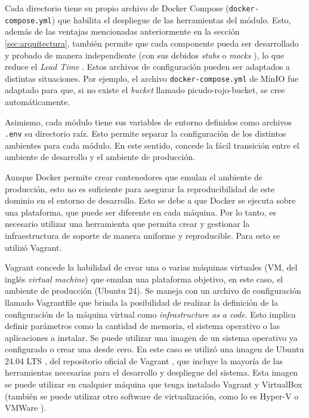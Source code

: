Cada directorio tiene su propio archivo de Docker Compose (\lstinline[language=sh]|docker-compose.yml|) que habilita el despliegue de las herramientas del módulo. Esto, además de las ventajas mencionadas anteriormente en la sección \ref{sec:arquitectura}, también permite que cada componente pueda ser desarrollado y probado de manera independiente (con sus debidos \textit{stubs} \citep{wikipedia_talon_2025} o \textit{mocks} \citep{wikipedia_objeto_2024}), lo que reduce el \textit{Lead Time} \citep{wikipedia_lead_2025}. Estos archivos de configuración pueden ser adaptados a distintas situaciones. Por ejemplo, el archivo \lstinline[language=sh]|docker-compose.yml| de MinIO fue adaptado para que, si no existe el \textit{bucket} llamado picudo-rojo-bucket, se cree automáticamente.

Asimismo, cada módulo tiene sus variables de entorno definidos como archivos \lstinline[language=sh]|.env| su directorio raíz. Esto permite separar la configuración de los distintos ambientes para cada módulo. En este sentido, concede la fácil transición entre el ambiente de desarrollo y el ambiente de producción.

Aunque Docker permite crear contenedores que emulan el ambiente de producción, esto no es suficiente para asegurar la reproducibilidad de este dominio en el entorno de desarrollo. Esto se debe a que Docker se ejecuta sobre una plataforma, que puede ser diferente en cada máquina. Por lo tanto, es necesario utilizar una herramienta que permita crear y gestionar la infraestructura de soporte de manera uniforme y reproducible. Para esto se utilizó Vagrant.

Vagrant concede la habilidad de crear una o varias máquinas virtuales (VM, del inglés \textit{virtual machine}) que emulan una plataforma objetivo, en este caso, el ambiente de producción (Ubuntu 24). Se maneja con un archivo de configuración llamado Vagrantfile que brinda la posibilidad de realizar la definición de la configuración de la máquina virtual como \textit{infrastructure as a code}. Esto implica definir parámetros como la cantidad de memoria, el sistema operativo o las aplicaciones a instalar. Se puede utilizar una imagen de un sistema operativo ya configurado o crear una desde cero. En este caso se utilizó una imagen de Ubuntu 24.04 LTS \citep{progress_chefs_bento_bentoubuntu-2404_nodate}, del repositorio oficial de Vagrant \citep{hashicorp_hashicorp_nodate}, que incluye la mayoría de las herramientas necesarias para el desarrollo y despliegue del sistema. Esta imagen se puede utilizar en cualquier máquina que tenga instalado Vagrant y VirtualBox \citep{wikipedia_virtualbox_2025} (también se puede utilizar otro software de virtualización, como lo es Hyper-V \citep{meaghanlewis_informacion_2025} o VMWare \citep{wikipedia_vmware_2025}).

